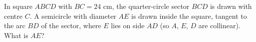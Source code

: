 In square $ABCD$ with $BC=24$ cm, the quarter-circle sector $BCD$ is drawn with centre $C$. A semicircle with diameter $AE$ is drawn inside the square, tangent to the arc $BD$ of the sector, where $E$ lies on side $AD$ (so $A$, $E$, $D$ are collinear). What is $AE$?
